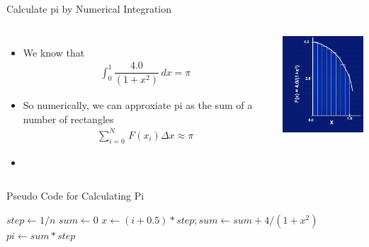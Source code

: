 \documentclass[c,mathserif,compress,xcolor=svgnames]{beamer}
\begin{document}
\begin{frame}[allowframebreaks]{Calculate pi by Numerical Integration}
  \begin{columns}
    \column{5cm}
    \begin{itemize}
      \item We know that
      \begin{align*}
        \int^1_0 \dfrac{4.0}{(1+x^2)}\, dx = \pi
      \end{align*}
      \item So numerically, we can approxiate pi as the sum of a number of rectangles
      \begin{align*}
        \sum^N_{i=0}\,F(x_i)\Delta x \approx \pi
      \end{align*}
      \item[] 
    \end{itemize}
    \column{5cm}
    \begin{center}
      \includegraphics[width=4cm]{./pi}
    \end{center}
  \end{columns}

  \begin{algorithm}[H]
    \caption{Pseudo Code for Calculating Pi}
    \begin{algorithmic}
        \State $step \gets 1/n$
        \State $sum \gets 0$
        \State $x \gets (i+0.5)*step; sum \gets sum + 4/(1+x^2)$
        \EndDo
        \State $pi \gets sum * step$
        \EndFunction
    \end{algorithmic}
  \end{algorithm}
\end{frame}
\end{document}
